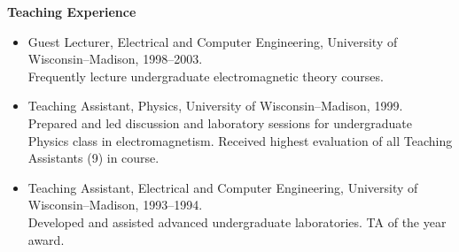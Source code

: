 {\bf\large Teaching Experience}
\begin{itemize}
\item Guest Lecturer, Electrical and Computer Engineering,
  University of Wisconsin--Madison, 1998--2003.\\
  Frequently lecture undergraduate electromagnetic theory courses.
\item Teaching Assistant, Physics, University of Wisconsin--Madison,
  1999.\\
  Prepared and led discussion and laboratory sessions for
  undergraduate Physics class in electromagnetism. Received highest
  evaluation of all Teaching Assistants (9) in course.
\item Teaching Assistant, Electrical and Computer Engineering,
  University of Wisconsin--Madison, 1993--1994.\\
  Developed and assisted advanced undergraduate
  laboratories. TA of the year award.
\end{itemize}

